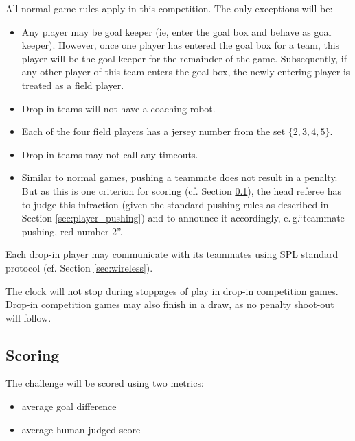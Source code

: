 \documentclass[12pt]{article}
\newcommand{\eg}{\mbox{e.\,g.}\xspace}
\newcommand{\cf}{\mbox{cf.}\xspace}
\begin{document}
All normal game rules apply in this competition.  The only exceptions will be:
\begin{itemize}
\item Any player may be goal keeper (ie, enter the goal box and behave as goal keeper).  However, once one player has entered the goal box for a team, this player will be the goal keeper for the remainder of the game.  Subsequently, if any other player of this team enters the goal box, the newly entering player is treated as a field player.
\item Drop-in teams will not have a coaching robot.
\item Each of the four field players has a jersey number from the set $\{2, 3, 4, 5\}$.
\item Drop-in teams may not call any timeouts.
\item Similar to normal games, pushing a teammate does not result in a penalty. But as this is one criterion for scoring (\cf Section \ref{sec:drop-in:scoring}), the head referee has to judge this infraction (given the standard pushing rules as described in Section \ref{sec:player_pushing}) and to announce it accordingly, \eg ``teammate pushing, red number 2''. 
\end{itemize}

Each drop-in player may communicate with its teammates using SPL standard protocol (\cf Section \ref{sec:wireless}). 

The clock will not stop during stoppages of play in drop-in competition games.  Drop-in competition games may also finish in a draw, as no penalty shoot-out will follow.

\subsection{Scoring}
\label{sec:drop-in:scoring}
The challenge will be scored using two metrics: 
\begin{itemize}
\item average goal difference 
\item average human judged score 
\end{itemize}
\end{document}
